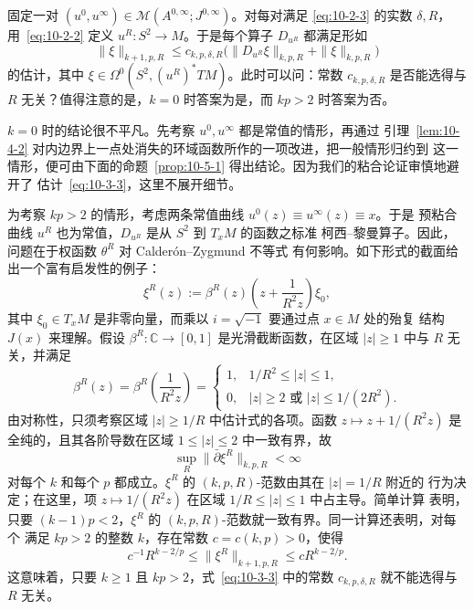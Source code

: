 \begin{remark}\label{rem:10-3-4}
固定一对 $(u^0,u^\infty)\in\mathcal M(A^{0,\infty};J^{0,\infty})$。对每对满足
\eqref{eq:10-2-3} 的实数 $\delta,R$，用~\eqref{eq:10-2-2} 定义
$u^R:S^2\to M$。于是每个算子 $D_{u^R}$ 都满足形如
\begin{equation}\label{eq:10-3-3}
  \|\xi\|_{k+1,p,R}
  \le c_{k,p,\delta,R}
  \bigl(\|D_{u^R}\xi\|_{k,p,R}+\|\xi\|_{k,p,R}\bigr)
\end{equation}
的估计，其中 $\xi\in\Omega^0(S^2,(u^R)^*TM)$。此时可以问：常数
$c_{k,p,\delta,R}$ 是否能选得与 $R$ 无关？值得注意的是，$k=0$ 时答案为是，而
$kp>2$ 时答案为否。

$k=0$ 时的结论很不平凡。先考察 $u^0,u^\infty$ 都是常值的情形，再通过
引理~\ref{lem:10-4-2} 对内边界上一点处消失的环域函数所作的一项改进，把一般情形归约到
这一情形，便可由下面的命题~\ref{prop:10-5-1} 得出结论。因为我们的粘合论证审慎地避开了
估计~\eqref{eq:10-3-3}，这里不展开细节。

为考察 $kp>2$ 的情形，考虑两条常值曲线 $u^0(z)\equiv u^\infty(z)\equiv x$。于是
预粘合曲线 $u^R$ 也为常值，$D_{u^R}$ 是从 $S^2$ 到 $T_xM$ 的函数之标准
柯西--黎曼算子。因此，问题在于权函数 $\theta^R$ 对 Calderón--Zygmund 不等式
有何影响。如下形式的截面给出一个富有启发性的例子：
\[
  \xi^R(z):=\beta^R(z)\left(z+\frac{1}{R^2z}\right)\xi_0,
\]
其中 $\xi_0\in T_xM$ 是非零向量，而乘以 $i=\sqrt{-1}$ 要通过点 $x\in M$ 处的殆复
结构 $J(x)$ 来理解。假设 $\beta^R:\mathbb C\to[0,1]$ 是光滑截断函数，在区域
$|z|\ge1$ 中与 $R$ 无关，并满足
\[
  \beta^R(z)=\beta^R\left(\frac{1}{R^2z}\right)
  =
  \begin{cases}
    1,& 1/R^2\le|z|\le1,\\
    0,& |z|\ge2\text{ 或 }|z|\le1/(2R^2).
  \end{cases}
\]
由对称性，只须考察区域 $|z|\ge1/R$ 中估计式的各项。函数
$z\mapsto z+1/(R^2z)$ 是全纯的，且其各阶导数在区域 $1\le|z|\le2$ 中一致有界，故
\[
  \sup_R\|\bar\partial\xi^R\|_{k,p,R}<\infty
\]
对每个 $k$ 和每个 $p$ 都成立。$\xi^R$ 的 $(k,p,R)$-范数由其在 $|z|=1/R$ 附近的
行为决定；在这里，项 $z\mapsto1/(R^2z)$ 在区域 $1/R\le|z|\le1$ 中占主导。简单计算
表明，只要 $(k-1)p<2$，$\xi^R$ 的 $(k,p,R)$-范数就一致有界。同一计算还表明，对每个
满足 $kp>2$ 的整数 $k$，存在常数 $c=c(k,p)>0$，使得
\[
  c^{-1}R^{k-2/p}
  \le\|\xi^R\|_{k+1,p,R}
  \le cR^{k-2/p}.
\]
这意味着，只要 $k\ge1$ 且 $kp>2$，式~\eqref{eq:10-3-3} 中的常数
$c_{k,p,\delta,R}$ 就不能选得与 $R$ 无关。
\end{remark}

